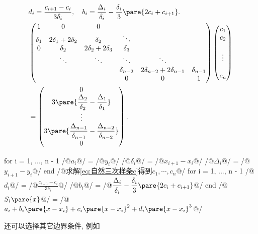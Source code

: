 \documentclass[20pt]{extarticle}
\begin{document}
\begin{align}
    & d_i = \frac{c_{i+1} - c_i}{3\delta_i},\quad b_i = \frac{\Delta_i}{\delta_i} - \frac{\delta_i}{3}\pare{2c_i + c_{i+1}}. \notag \\
    & \begin{pmatrix}
        1 & 0 & 0 \\
        \delta_1 & 2\delta_1 + 2\delta_2 & \delta_2 & \ddots \\
        0 & \delta_2 & 2\delta_2+2\delta_3 & \delta_3 \\
        & \ddots & \ddots & \ddots & \ddots \\
        & & & \delta_{n-2} & 2\delta_{n-2}+2\delta_{n-1} & \delta_{n-1} \\
        & & & 0 & 0 & 1
    \end{pmatrix} \begin{pmatrix}
        c_1 \\ c_2 \\ \\ \vdots \\ \\ c_n
    \end{pmatrix} \notag \\ \label{eq:自然三次样条c} &= \begin{pmatrix}
        0 \\ \displaystyle 3\pare{\frac{\Delta_2}{\delta_2} - \frac{\Delta_1}{\delta_1}} \\ \vdots \\ \displaystyle 3\pare{\frac{\Delta_{n-1}}{\delta_{n-1}} - \frac{\Delta_{n-2}}{\delta_{n-2}}} \\ 0
    \end{pmatrix}.
\end{align}
\begin{matlablst}
for i = 1, ..., n - 1
    /@$a_i$@/ = /@$y_i$@/
    /@$\delta_i$@/ = /@$x_{i+1} - x_i$@/
    /@$\Delta_i$@/ = /@$y_{i+1} - y_i$@/
end
/@求解\eqref{eq:自然三次样条c}得到$c_1,\cdots,c_n$@/
for i = 1, ..., n - 1
    /@$d_i$@/ = /@$\displaystyle \frac{c_{i+1}-c_i}{3\delta_i}$@/
    /@$b_i$@/ = /@$\displaystyle \frac{\Delta_i}{\delta_i} - \displaystyle \frac{\delta_i}{3}\pare{2c_i+c_{i+1}}$@/
end
/@$S_i\pare{x}$@/ = /@$a_i + b_i\pare{x-x_i} + c_i\pare{x-x_i}^2 + d_i\pare{x-x_i}^3$@/
\end{matlablst}
还可以选择其它边界条件, 例如
\end{document}
